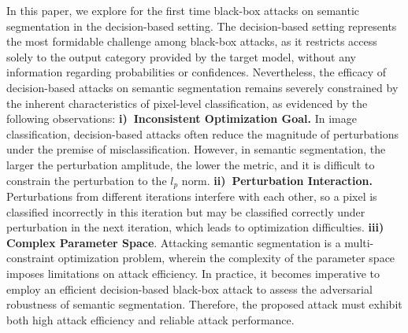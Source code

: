 \documentclass[10pt,twocolumn,letterpaper]{article}
\begin{document}
In this paper, we explore for the first time black-box attacks on semantic segmentation in the decision-based setting. The decision-based setting represents the most formidable challenge among black-box attacks, as it restricts access solely to the output category provided by the target model, without any information regarding probabilities or confidences. 
Nevertheless, the efficacy of decision-based attacks on semantic segmentation remains severely constrained by the inherent characteristics of pixel-level classification, as evidenced by the following observations: 
\textbf{i)~Inconsistent Optimization Goal.} In image classification, decision-based attacks often reduce the magnitude of perturbations under the premise of misclassification. However, in semantic segmentation, the larger the perturbation amplitude, the lower the metric, and it is difficult to constrain the perturbation to the $l_p$ norm. \textbf{ii)~Perturbation Interaction.} Perturbations from different iterations interfere with each other, so a pixel is classified incorrectly in this iteration but may be classified correctly under perturbation in the next iteration, which leads to optimization difficulties. \textbf{iii) Complex Parameter Space}. Attacking semantic segmentation is a multi-constraint optimization problem, wherein the complexity of the parameter space imposes limitations on attack efficiency. In practice, it becomes imperative to employ an efficient decision-based black-box attack to assess the adversarial robustness of semantic segmentation. Therefore, the proposed attack must exhibit both high attack efficiency and reliable attack performance.
\end{document}
